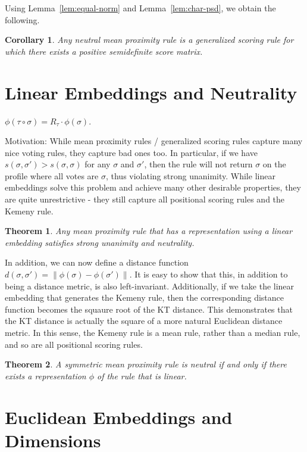 \documentclass[10pt,letterpaper]{article}
\newtheorem{theorem}{Theorem}
\newtheorem{corollary}{Corollary}
\newenvironment{definition}[1][Definition]{\begin{trivlist}
\item[\hskip \labelsep {\bfseries #1}]}{\end{trivlist}}
\begin{document}
Using Lemma~\ref{lem:equal-norm} and Lemma~\ref{lem:char-psd}, we obtain the following.
\begin{corollary}
Any neutral mean proximity rule is a generalized scoring rule for which there exists a positive semidefinite score matrix.
\end{corollary}

\section{Linear Embeddings and Neutrality}
\begin{definition}[Linear Embeddings]
$\phi(\tau \circ \sigma) = R_{\tau} \cdot \phi(\sigma)$. 
\end{definition}

Motivation: While mean proximity rules / generalized scoring rules capture many nice voting rules, they capture bad ones too. In particular, if we have $s(\sigma,\sigma') > s(\sigma,\sigma)$ for any $\sigma$ and $\sigma'$, then the rule will not return $\sigma$ on the profile where all votes are $\sigma$, thus violating strong unanimity. While linear embeddings solve this problem and achieve many other desirable properties, they are quite unrestrictive - they still capture all positional scoring rules and the Kemeny rule.

\begin{theorem}
Any mean proximity rule that has a representation using a linear embedding satisfies strong unanimity and neutrality. 
\end{theorem}

In addition, we can now define a distance function $d(\sigma,\sigma') = \|\phi(\sigma)-\phi(\sigma')\|$. It is easy to show that this, in addition to being a distance metric, is also left-invariant. Additionally, if we take the linear embedding that generates the Kemeny rule, then the corresponding distance function becomes the squaure root of the KT distance. This demonstrates that the KT distance is actually the square of a more natural Euclidean distance metric. In this sense, the Kemeny rule is a mean rule, rather than a median rule, and so are all positional scoring rules. 

\begin{theorem}
A symmetric mean proximity rule is neutral if and only if there exists a representation $\phi$ of the rule that is linear. 
\label{thm:neutrality-linear-embedding}
\end{theorem}

\section{Euclidean Embeddings and Dimensions}
\end{document}
